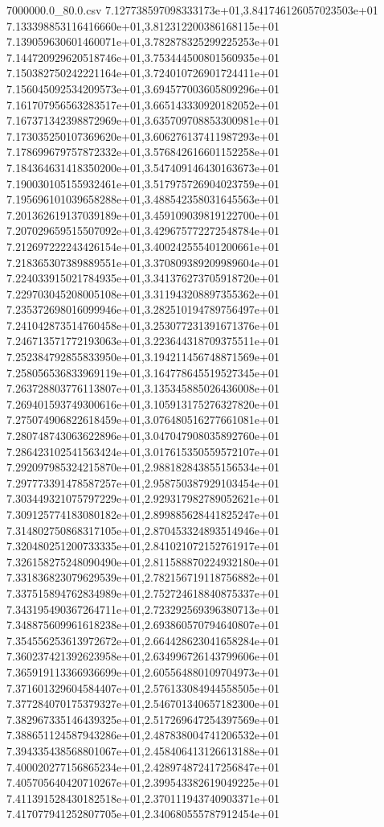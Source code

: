 \begin{filecontents*}{7000000.0_80.0.csv}
7.127738597098333173e+01,3.841746126057023503e+01
7.133398853116416660e+01,3.812312200386168115e+01
7.139059630601460071e+01,3.782878325299225253e+01
7.144720929620518746e+01,3.753444500801560935e+01
7.150382750242221164e+01,3.724010726901724411e+01
7.156045092534209573e+01,3.694577003605809296e+01
7.161707956563283517e+01,3.665143330920182052e+01
7.167371342398872969e+01,3.635709708853300981e+01
7.173035250107369620e+01,3.606276137411987293e+01
7.178699679757872332e+01,3.576842616601152258e+01
7.184364631418350200e+01,3.547409146430163673e+01
7.190030105155932461e+01,3.517975726904023759e+01
7.195696101039658288e+01,3.488542358031645563e+01
7.201362619137039189e+01,3.459109039819122700e+01
7.207029659515507092e+01,3.429675772272548784e+01
7.212697222243426154e+01,3.400242555401200661e+01
7.218365307389889551e+01,3.370809389209989604e+01
7.224033915021784935e+01,3.341376273705918720e+01
7.229703045208005108e+01,3.311943208897355362e+01
7.235372698016099946e+01,3.282510194789756497e+01
7.241042873514760458e+01,3.253077231391671376e+01
7.246713571772193063e+01,3.223644318709375511e+01
7.252384792855833950e+01,3.194211456748871569e+01
7.258056536833969119e+01,3.164778645519527345e+01
7.263728803776113807e+01,3.135345885026436008e+01
7.269401593749300616e+01,3.105913175276327820e+01
7.275074906822618459e+01,3.076480516277661081e+01
7.280748743063622896e+01,3.047047908035892760e+01
7.286423102541563424e+01,3.017615350559572107e+01
7.292097985324215870e+01,2.988182843855156534e+01
7.297773391478587257e+01,2.958750387929103454e+01
7.303449321075797229e+01,2.929317982789052621e+01
7.309125774183080182e+01,2.899885628441825247e+01
7.314802750868317105e+01,2.870453324893514946e+01
7.320480251200733335e+01,2.841021072152761917e+01
7.326158275248090490e+01,2.811588870224932180e+01
7.331836823079629539e+01,2.782156719118756882e+01
7.337515894762834989e+01,2.752724618840875337e+01
7.343195490367264711e+01,2.723292569396380713e+01
7.348875609961618238e+01,2.693860570794640807e+01
7.354556253613972672e+01,2.664428623041658284e+01
7.360237421392623958e+01,2.634996726143799606e+01
7.365919113366936699e+01,2.605564880109704973e+01
7.371601329604584407e+01,2.576133084944558505e+01
7.377284070175379327e+01,2.546701340657182300e+01
7.382967335146439325e+01,2.517269647254397569e+01
7.388651124587943286e+01,2.487838004741206532e+01
7.394335438568801067e+01,2.458406413126613188e+01
7.400020277156865234e+01,2.428974872417256847e+01
7.405705640420710267e+01,2.399543382619049225e+01
7.411391528430182518e+01,2.370111943740903371e+01
7.417077941252807705e+01,2.340680555787912454e+01

\end{filecontents*}
